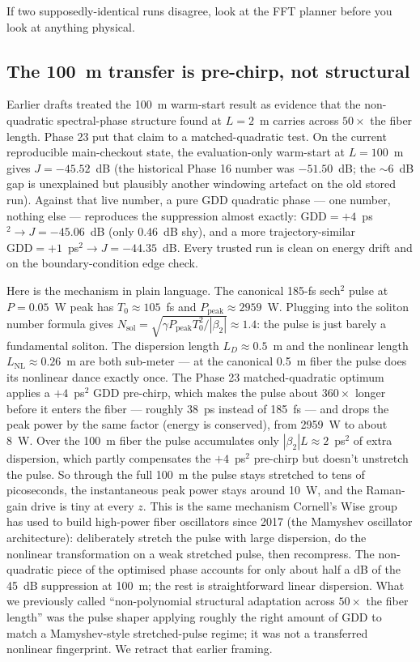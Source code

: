 \documentclass[12pt,a4paper]{article}
\begin{document}
\begin{intuition}
If two supposedly-identical runs disagree, look at the FFT planner
before you look at anything physical.
\end{intuition}

\subsection{The 100~m transfer is pre-chirp, not structural}
\label{sec:companion-100m-pre-chirp}

Earlier drafts treated the 100~m warm-start result as evidence that
the non-quadratic spectral-phase structure found at $L{=}2$~m carries
across $50\times$ the fiber length. Phase 23 put that claim to a
matched-quadratic test. On the current reproducible main-checkout
state, the evaluation-only warm-start at $L{=}100$~m gives
$J = -45.52$~dB (the historical Phase 16 number was $-51.50$~dB;
the $\sim 6$~dB gap is unexplained but plausibly another windowing
artefact on the old stored run). Against that live number, a pure
GDD quadratic phase --- one number, nothing else --- reproduces the
suppression almost exactly: $\text{GDD} = +4$~ps$^2 \to J = -45.06$~dB
(only $0.46$~dB shy), and a more trajectory-similar
$\text{GDD} = +1$~ps$^2 \to J = -44.35$~dB. Every trusted run is
clean on energy drift and on the boundary-condition edge check.

Here is the mechanism in plain language. The canonical 185-fs sech$^2$
pulse at $P = 0.05$~W peak has $T_0 \approx 105$~fs and $P_\text{peak}
\approx 2959$~W. Plugging into the soliton number formula gives
$N_\text{sol} = \sqrt{\gamma P_\text{peak} T_0^2 / |\beta_2|} \approx
1.4$: the pulse is just barely a fundamental soliton. The dispersion
length $L_D \approx 0.5$~m and the nonlinear length $L_\text{NL}
\approx 0.26$~m are both sub-meter --- at the canonical 0.5~m fiber
the pulse does its nonlinear dance exactly once.
The Phase 23 matched-quadratic optimum applies a $+4$~ps$^2$ GDD
pre-chirp, which makes the pulse about $360\times$ longer before it
enters the fiber --- roughly 38~ps instead of 185~fs --- and drops
the peak power by the same factor (energy is conserved), from 2959~W
to about 8~W. Over the 100~m fiber the pulse accumulates only
$|\beta_2|L \approx 2$~ps$^2$ of extra dispersion, which partly
compensates the $+4$~ps$^2$ pre-chirp but doesn't unstretch the
pulse. So through the full 100~m the pulse stays stretched to tens
of picoseconds, the instantaneous peak power stays around 10~W, and
the Raman-gain drive is tiny at every $z$. This is the same
mechanism Cornell's Wise group has used to build high-power fiber
oscillators since 2017 (the Mamyshev oscillator architecture):
deliberately stretch the pulse with large dispersion, do the
nonlinear transformation on a weak stretched pulse, then recompress.
The non-quadratic piece of the optimised phase accounts for only
about half a dB of the 45~dB suppression at 100~m; the rest is
straightforward linear dispersion. What we previously called
``non-polynomial structural adaptation across $50\times$ the fiber
length'' was the pulse shaper applying roughly the right amount of
GDD to match a Mamyshev-style stretched-pulse regime; it was not a
transferred nonlinear fingerprint. We retract that earlier framing.
\end{document}
